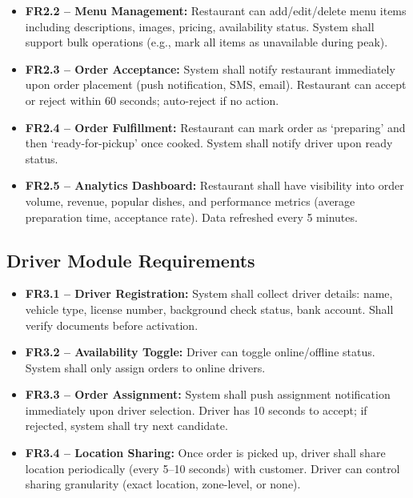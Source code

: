 \documentclass[12pt,a4paper]{report}
\begin{document}
\begin{itemize}
\begin{itemize}
    \item \textbf{FR2.2 -- Menu Management:} Restaurant can add/edit/delete menu items including descriptions, images, pricing, availability status. System shall support bulk operations (e.g., mark all items as unavailable during peak).
    
    \item \textbf{FR2.3 -- Order Acceptance:} System shall notify restaurant immediately upon order placement (push notification, SMS, email). Restaurant can accept or reject within 60 seconds; auto-reject if no action.
    
    \item \textbf{FR2.4 -- Order Fulfillment:} Restaurant can mark order as `preparing' and then `ready-for-pickup' once cooked. System shall notify driver upon ready status.
    
    \item \textbf{FR2.5 -- Analytics Dashboard:} Restaurant shall have visibility into order volume, revenue, popular dishes, and performance metrics (average preparation time, acceptance rate). Data refreshed every 5 minutes.
\end{itemize}

\subsection{Driver Module Requirements}

\begin{itemize}
    \item \textbf{FR3.1 -- Driver Registration:} System shall collect driver details: name, vehicle type, license number, background check status, bank account. Shall verify documents before activation.
    
    \item \textbf{FR3.2 -- Availability Toggle:} Driver can toggle online/offline status. System shall only assign orders to online drivers.
    
    \item \textbf{FR3.3 -- Order Assignment:} System shall push assignment notification immediately upon driver selection. Driver has 10 seconds to accept; if rejected, system shall try next candidate.
    
    \item \textbf{FR3.4 -- Location Sharing:} Once order is picked up, driver shall share location periodically (every 5--10 seconds) with customer. Driver can control sharing granularity (exact location, zone-level, or none).
    

\end{itemize}
\end{itemize}
\end{document}
